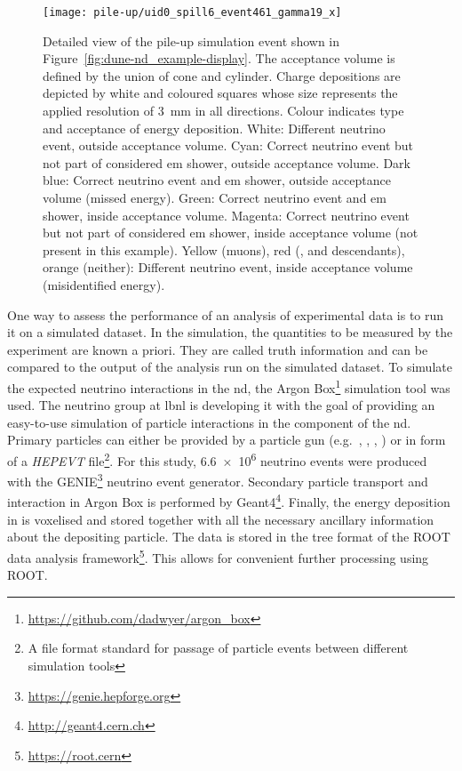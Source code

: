 \begin{figure}[htb]
	\centering
	\texttt{[image: pile-up/uid0\_spill6\_event461\_gamma19\_x]}
	\caption[Pile-up study example event zoom]{%
		Detailed view of the pile-up simulation event shown in Figure~\ref{fig:dune-nd_example-display}.
		The acceptance volume is defined by the union of cone and cylinder.
		Charge depositions are depicted by white and coloured squares whose size represents the applied resolution of \SI{3}{\milli\metre} in all directions.
		Colour indicates type and acceptance of energy deposition.
		White: Different neutrino event, outside acceptance volume.
		Cyan: Correct neutrino event but not part of considered \acrshort{em} shower, outside acceptance volume.
		Dark blue: Correct neutrino event and \acrshort{em} shower, outside acceptance volume (missed energy).
		Green: Correct neutrino event and \acrshort{em} shower, inside acceptance volume.
		Magenta: Correct neutrino event but not part of considered \acrshort{em} shower, inside acceptance volume (not present in this example).
		Yellow (muons), red (\Pgg, \Pn and descendants), orange (neither): Different neutrino event, inside acceptance volume (misidentified energy).
	}
	\label{fig:dune-nd_example-display-zoom}
\end{figure}

One way to assess the performance of an analysis of experimental data is to run it on a simulated dataset.
In the simulation, the quantities to be measured by the experiment are known a priori.
They are called truth information and can be compared to the output of the analysis run on the simulated dataset.
To simulate the expected neutrino interactions in the \gls{nd}, the Argon Box\footnote{\url{https://github.com/dadwyer/argon_box}} simulation tool was used.
The neutrino group at \gls{lbnl} is developing it with the goal of providing an easy-to-use simulation of particle interactions in the \lar{} component of the \gls{nd}.
Primary particles can either be provided by a particle gun (e.g.\ \Pem, \Pn, \Pp, \Pgmp) or in form of a \emph{HEPEVT} file\footnote{A file format standard for passage of particle events between different simulation tools}.
For this study, \num{6.6e6} neutrino events were produced with the GENIE\footnote{\url{https://genie.hepforge.org}} neutrino event generator.
Secondary particle transport and interaction in Argon Box is performed by Geant4\footnote{\url{http://geant4.cern.ch}}.
Finally, the energy deposition in \lar{} is voxelised and stored together with all the necessary ancillary information about the depositing particle.
The data is stored in the tree format of the ROOT data analysis framework\footnote{\url{https://root.cern}}.
This allows for convenient further processing using ROOT.

